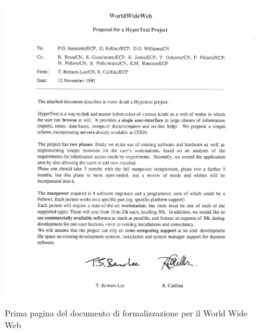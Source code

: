 \begin{figure}
    \centering
    \includegraphics[width=1.0\textwidth]{images/proposta-web-1990.jpg}
    \caption{Prima pagina del documento di formalizzazione per il World Wide Web}
    \label{fig:proposta1990}
    \cite{formalizzazione1990}
\end{figure}
\FloatBarrier %


